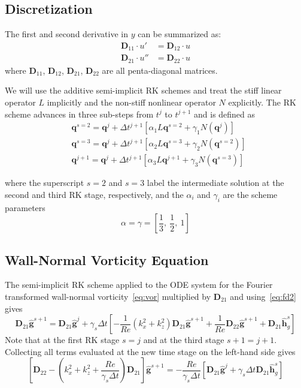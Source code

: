 \documentclass[titlepage,12pt,letter]{article}
\newcommand{\bracket}[1]{\left[ #1 \right]}
\newcommand{\re}{Re}
\numberwithin{equation}{section}
\begin{document}
\subsection{Discretization}
The first and second derivative in $y$ can be summarized as:
\begin{align}
	\bm{D}_{11} \cdot u' &= \bm{D}_{12} \cdot u \label{eq:fd1}\\
	\bm{D}_{21} \cdot u'' &= \bm{D}_{22} \cdot u \label{eq:fd2}
\end{align}
where $\bm{D}_{11}$, $\bm{D}_{12}$, $\bm{D}_{21}$, $\bm{D}_{22}$ are all penta-diagonal matrices.

We will use the additive semi-implicit RK schemes and treat the stiff linear operator $L$ implicitly and the non-stiff nonlinear operator $N$ explicitly. The RK scheme advances in three sub-steps from $t^{j}$ to $t^{j+1}$ and is defined as
\begin{align*}
	&\bm{q}^{s=2}=\bm{q}^{j}+\Delta t^{j+1}\left[\alpha_{1} L \bm{q}^{s=2}+\gamma_{1} N\left(\bm{q}^{j}\right)\right] \\
	&\bm{q}^{s=3}=\bm{q}^{j}+\Delta t^{j+1}\left[\alpha_{2} L \bm{q}^{s=3}+\gamma_{2} N\left(\bm{q}^{s=2}\right)\right] \\
	&\bm{q}^{j+1}=\bm{q}^{j}+\Delta t^{j+1}\left[\alpha_{3} L \bm{q}^{j+1}+\gamma_{3} N\left(\bm{q}^{s=3}\right)\right]
\end{align*}

where the superscript $s=2$ and $s=3$ label the intermediate solution at the second and third RK stage, respectively, and the $\alpha_{i}$ and $\gamma_{i}$ are the scheme parameters 
\begin{equation}
	\alpha = \gamma=\bracket{\frac{1}{3}, \ \frac{1}{2}, \ 1}
\end{equation}

\subsection{Wall-Normal Vorticity Equation}
The semi-implicit RK scheme applied to the ODE system for the Fourier transformed wall-normal vorticity~\eqref{eq:vor} multiplied by $\bm{D}_{21}$ and using~\eqref{eq:fd2} gives
\begin{equation*}
	\bm{D}_{21} \hat{\bm{g}}^{s+1}=\bm{D}_{21} \hat{\bm{g}}^{j}+\gamma_{s} \Delta t \bracket{ -\frac{1}{\re}\left(k_x^{2}+k_z^{2}\right) \bm{D}_{21} \hat{\bm{g}}^{s+1}+\frac{1}{\re} \bm{D}_{22} \hat{\bm{g}}^{s+1}+\bm{D}_{21} \hat{\bm{h}}_{g}^{s} }
\end{equation*}
Note that at the first RK stage $s=j$ and at the third stage $s+1=j+1$. Collecting all terms evaluated at the new time stage on the left-hand side gives
\begin{equation}
	\bracket{\bm{D}_{22}-\left(k_x^{2}+k_z^{2}+\frac{\re}{\gamma_{s} \Delta t}\right) \bm{D}_{21}} \hat{\bm{g}}^{s+1}=-\frac{\re}{\gamma_{s} \Delta t} \bracket{ \bm{D}_{21} \hat{\bm{g}}^{j}+\gamma_{s} \Delta t \bm{D}_{21} \hat{\bm{h}}_{g}^{s} } \label{eq:ome}
\end{equation}
\end{document}
